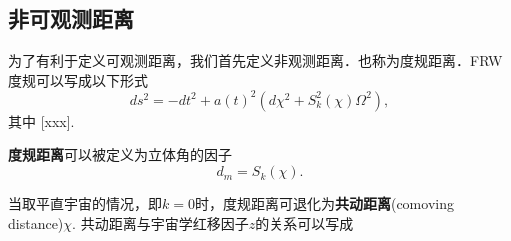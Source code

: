 

\subsection{非可观测距离}
为了有利于定义可观测距离，我们首先定义非观测距离．也称为度规距离．FRW度规可以写成以下形式
\begin{equation}
ds^2=-dt^2+a(t)^2(d\chi^2+S^2_k (\chi) \Omega^2),
\end{equation}
其中
[xxx].

\textbf{度规距离}可以被定义为立体角的因子
\begin{equation}
d_m=S_k(\chi).
\end{equation}

当取平直宇宙的情况，即$k=0$时，度规距离可退化为\textbf{共动距离}(comoving distance)$\chi$. 共动距离与宇宙学红移因子$z$的关系可以写成
\begin{equation}

\end{equation}

